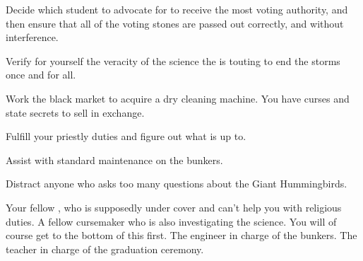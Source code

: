 \documentclass[char]{GL2020}
\begin{document}
%
%
%
%
%
%
%
%

\begin{itemz}[Goals]
	\item Decide which \pFarm{} student to advocate for to receive the most voting authority, and then ensure that all of the voting stones are passed out correctly, and without interference.
	\item Verify for yourself the veracity of the science the \pTech{} is touting to end the storms once and for all.
	\item Work the black market to acquire a dry cleaning machine. You have curses and state secrets to sell in exchange.
	\item Fulfill your priestly duties and figure out what \cInterpol{} is up to.
	\item Assist \cBunker{} with standard maintenance on the bunkers.
	\item Distract anyone who asks too many questions about the Giant Hummingbirds.
\end{itemz}

\begin{itemz}[Notes]
	\item 
\end{itemz}

\begin{contacts}
	\contact{\cInterpol{}} Your fellow \cInterpol{\cleric}, who is supposedly under cover and can’t help you with religious duties.
	\contact{\cCurse{}} A fellow cursemaker who is also investigating the \pTech{} science. You will of course get to the bottom of this first.
	\contact{\cBunker{}} The \pShip{} engineer in charge of the bunkers.
	\contact{\cMusic{}} The teacher in charge of the graduation ceremony.
\end{contacts}
\end{document}
